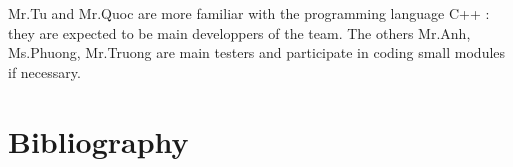 \documentclass[11pt]{article}
\begin{document}
\par\noindent Mr.Tu and Mr.Quoc are more familiar with the programming language C++ : they are expected to be main developpers of the team. The others Mr.Anh, Ms.Phuong, Mr.Truong are main testers and participate in coding small modules if necessary.
\begin{figure}[H] 
  \label{fig:gantt2}
\end{figure} 


\section{Bibliography}
\end{document}
